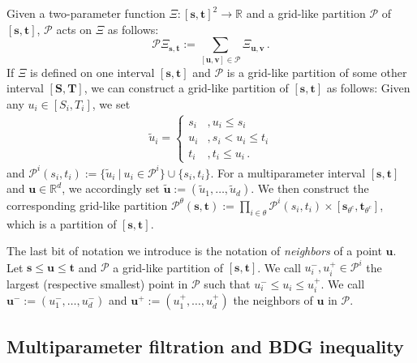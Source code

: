 \documentclass[11pt,oneside,english,reqno]{amsart}
\numberwithin{equation}{section}
\numberwithin{figure}{section}
\theoremstyle{plain}
\theoremstyle{definition}
\theoremstyle{remark}
\theoremstyle{plain}
\theoremstyle{plain}
\theoremstyle{plain}
\theoremstyle{plain}
\theoremstyle{plain}
\newcommand{\cP}{\mathcal{P}}
\newcommand{\RR}{\mathbb{R}}
\newcommand{\bS}{\mathbf{S}}
\newcommand{\bT}{\mathbf{T}}
\newcommand{\bu}{\mathbf{u}}
\newcommand{\bv}{\mathbf{v}}
\newcommand{\bs}{\mathbf{s}}
\newcommand{\bt}{\mathbf{t}}
\begin{document}
Given a two-parameter function $\Xi:[\bs,\bt]^2\to \RR$ and a grid-like partition $\cP$ of $[\bs,\bt]$, $\cP$ acts on $\Xi$ as follows:
%
\begin{equation*}
    \cP\Xi_{\bs,\bt} := \sum_{[\bu,\bv]\in\cP}\Xi_{\bu,\bv}\,.
\end{equation*}
%
If $\Xi$ is defined on one interval $[\bs,\bt]$ and $\cP$ is a grid-like partition of some other interval $[\bS,\bT]$, we can construct a grid-like partition of $[\bs,\bt]$ as follows: Given any $u_i\in[S_i,T_i]$, we set
%
\begin{equation}
\begin{split}
    \tilde u_i = \begin{cases}
        s_i &, u_i\le s_i \\
        u_i &, s_i<u_i\le t_i \\
        t_i &, t_i\le u_i\,.
    \end{cases}    
\end{split}
\label{tilde notation}
\end{equation}
%
and $\cP^i(s_i,t_i) := \{\tilde u_i ~\vert~ u_i\in\cP^i\}\cup\{s_i,t_i\}$. For a multiparameter interval $[\bs,\bt]$ and $\mathbf u\in\RR^d$, we accordingly set $\tilde {\mathbf u} := (\tilde u_1,\dots,\tilde u_d)$. We then construct the corresponding grid-like partition $\cP^\theta(\bs,\bt) := \prod_{i\in\theta} \cP^i(s_i,t_i)\times[\bs_{\theta^c},\bt_{\theta^c}]$, which is a partition of $[\bs,\bt]$.

The last bit of notation we introduce is the notation of \emph{neighbors} of a point $\bu$. Let $\bs\le\bu\le\bt$ and $\cP$ a grid-like partition of $[\bs,\bt]$. We call $u_i^-, u_i^+\in\cP^i$ the largest (respective smallest) point in $\cP$ such that $u_i^-\le u_i \le u_i^+$. We call $\bu^- := (u_1^-,\dots, u_d^-)$ and $\bu^+ := (u_1^+,\dots,u_d^+)$ the neighbors of $\bu$ in $\cP$.


\subsection{Multiparameter filtration and BDG inequality}
\end{document}
